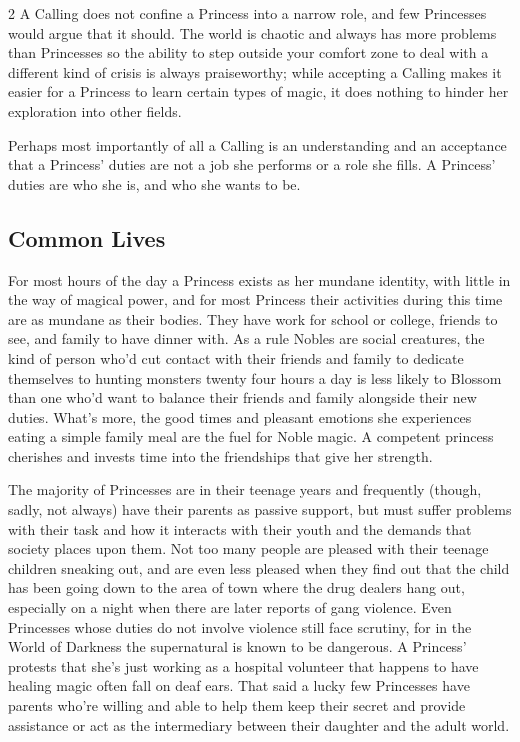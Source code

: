 \begin{multicols}{2}
A Calling does not confine a Princess into a narrow role, and few Princesses would argue that it should. The world is chaotic and always has more problems than Princesses so the ability to step outside your comfort zone to deal with a different kind of crisis is always praiseworthy; while accepting a Calling makes it easier for a Princess to learn certain types of magic, it does nothing to hinder her exploration into other fields. 

Perhaps most importantly of all a Calling is an understanding and an acceptance that a Princess' duties are not a job she performs or a role she fills. A Princess' duties are who she is, and who she wants to be. 

\subsection*{Common Lives}

For most hours of the day a Princess exists as her mundane identity, with little in the way of magical power, and for most Princess their activities during this time are as mundane as their bodies. They have work for school or college, friends to see, and family to have dinner with. As a rule Nobles are social creatures, the kind of person who'd cut contact with their friends and family to dedicate themselves to hunting monsters twenty four hours a day is less likely to Blossom than one who'd want to balance their friends and family alongside their new duties. What's more, the good times and pleasant emotions she experiences eating a simple family meal are the fuel for Noble magic. A competent princess cherishes and invests time into the friendships that give her strength. 

The majority of Princesses are in their teenage years and frequently (though, sadly, not always) have their parents as passive support, but must suffer problems with their task and how it interacts with their youth and the demands that society places upon them. Not too many people are pleased with their teenage children sneaking out, and are even less pleased when they find out that the child has been going down to the area of town where the drug dealers hang out, especially on a night when there are later reports of gang violence. Even Princesses whose duties do not involve violence still face scrutiny, for in the World of Darkness the supernatural is known to be dangerous. A Princess' protests that she's just working as a hospital volunteer that happens to have healing magic often fall on deaf ears. That said a lucky few Princesses have parents who're willing and able to help them keep their secret and provide assistance or act as the intermediary between their daughter and the adult world. 


\end{multicols}
